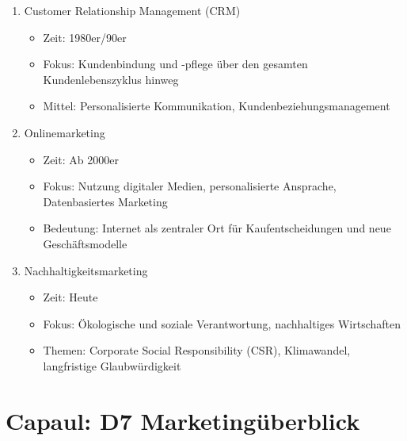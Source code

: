 \documentclass[12pt]{article}
\begin{document}
\begin{enumerate}
\begin{itemize}
    \end{itemize}
    \item Customer Relationship Management (CRM)
    \begin{itemize}
        \item Zeit: 1980er/90er
        \item Fokus: Kundenbindung und -pflege über den gesamten Kundenlebenszyklus hinweg
        \item Mittel: Personalisierte Kommunikation, Kundenbeziehungsmanagement
    \end{itemize}
    \item Onlinemarketing
    \begin{itemize}
        \item Zeit: Ab 2000er
        \item Fokus: Nutzung digitaler Medien, personalisierte Ansprache, Datenbasiertes Marketing
        \item Bedeutung: Internet als zentraler Ort für Kaufentscheidungen und neue Geschäftsmodelle
    \end{itemize}
    \item Nachhaltigkeitsmarketing
    \begin{itemize}
        \item Zeit: Heute
        \item Fokus: Ökologische und soziale Verantwortung, nachhaltiges Wirtschaften
        \item Themen: Corporate Social Responsibility (CSR), Klimawandel, langfristige Glaubwürdigkeit
    \end{itemize}
\end{enumerate}

\newpage
\section{Capaul: D7 Marketingüberblick}
\end{document}
